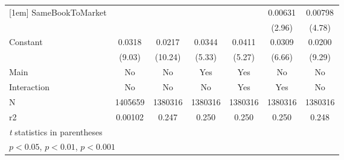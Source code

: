 {\begin{tabular}{l*{6}{c}}
[1em]
SameBookToMarket    &                     &                     &                     &                     &     0.00631\sym{**} &     0.00798\sym{***}\\
                    &                     &                     &                     &                     &      (2.96)         &      (4.78)         \\
[1em]
Constant            &      0.0318\sym{***}&      0.0217\sym{***}&      0.0344\sym{***}&      0.0411\sym{***}&      0.0309\sym{***}&      0.0200\sym{***}\\
                    &      (9.03)         &     (10.24)         &      (5.33)         &      (5.27)         &      (6.66)         &      (9.29)         \\
\hline
Main                &          No         &          No         &         Yes         &         Yes         &          No         &          No         \\
Interaction         &          No         &          No         &          No         &         Yes         &         Yes         &          No         \\
N                   &     1405659         &     1380316         &     1380316         &     1380316         &     1380316         &     1380316         \\
r2                  &     0.00102         &       0.247         &       0.250         &       0.250         &       0.250         &       0.248         \\
\hline\hline
\multicolumn{7}{l}{\footnotesize \textit{t} statistics in parentheses}\\
\multicolumn{7}{l}{\footnotesize \sym{*} \(p<0.05\), \sym{**} \(p<0.01\), \sym{***} \(p<0.001\)}\\
\end{tabular}
}
